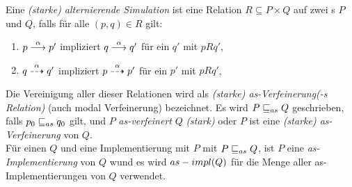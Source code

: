 \begin{Def}[Simulation]
  Eine \emph{(starke) alternierende Simulation} ist eine Relation $R\subseteq P
  \times Q$ auf zwei \MEIO{}s $P$ und $Q$, falls für alle $(p,q)\in R$ gilt:
  \begin{enumerate}
    \item $p\must[\alpha] p'$ impliziert $q\must[\alpha] q'$ für ein $q'$ mit
      $pRq'$,
    \item $q\may[\alpha] q'$ impliziert $p\may[\alpha] p'$ für ein $p'$ mit
      $pRq'$,
  \end{enumerate}
  Die Vereinigung \asRel{} aller dieser Relationen wird als \emph{(starke)
  as-Verfeinerung(-s Relation)} (auch modal Verfeinerung) bezeichnet. Es wird
  $P\sqsubseteq _{as} Q$ geschrieben, falls $p_0\sqsubseteq _{as} q_0$ gilt, und $P$
  \emph{as-verfeinert} $Q$ \emph{(stark)} oder $P$ ist eine \emph{(starke)
  as-Verfeinerung} von $Q$.\\
  Für einen \MEIO{} $Q$ und eine Implementierung mit $P$ mit $P\sqsubseteq _{as}{}Q$, ist
  $P$ eine \emph{as-Implementierung} von $Q$ wund es wird $as-impl (Q)$ für die
  Menge aller as-Implementierungen von $Q$ verwendet.
\end{Def}
